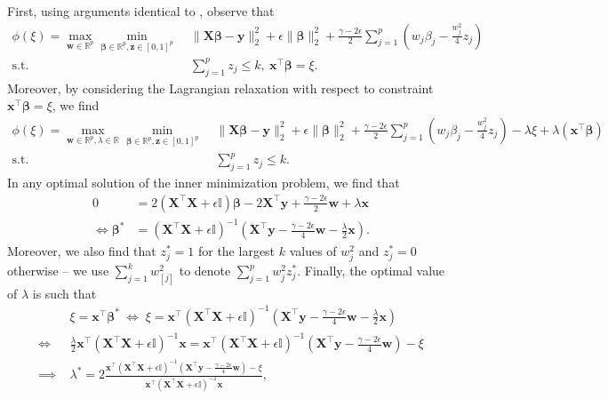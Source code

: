 \documentclass[opre,nonblindrev]{informs3} %
\begin{document}
First, using arguments identical to \cite{atamturk2020safe}, observe that
\begin{align*}
	\phi(\xi)=\max_{\bm{w}\in \mathbb{R}^p}\min_{\bm{\beta}\in \mathbb{R}^p,\bm{z}\in [0,1]^p}\;& \|\bm{X}\bm{\beta}-\bm{y}\|_2^2+\epsilon\|\bm{\beta}\|_2^2+\frac{\gamma-2\epsilon}{2}\sum_{j=1}^p \left(w_j\beta_j-\frac{w_j^2}{4}z_j\right)\\
	\text{s.t.}\;& \sum_{j=1}^p z_j\leq k,\ \bm{x^\top \beta}=\xi.
\end{align*}
Moreover, by considering the Lagrangian relaxation with respect to constraint $\bm{x^\top \beta}=\xi$, we find
\begin{align*}
	\phi(\xi)=\max_{\bm{w}\in \mathbb{R}^p,\lambda\in \mathbb{R}}\min_{\bm{\beta}\in \mathbb{R}^p,\bm{z}\in [0,1]^p}\;& \|\bm{X}\bm{\beta}-\bm{y}\|_2^2+\epsilon\|\bm{\beta}\|_2^2+\frac{\gamma-2\epsilon}{2}\sum_{j=1}^p \left(w_j\beta_j-\frac{w_j^2}{4}z_j\right)-\lambda\xi+\lambda (\bm{x^\top \beta})\\
	\text{s.t.}\;& \sum_{j=1}^p z_j\leq k.
\end{align*}
In any optimal solution of the inner minimization problem, we find that \begin{align*}0&=2(\bm{X}^\top \bm{X}+\epsilon\mathbb{I})\bm{\beta}-2\bm{X}^\top \bm{y}+\frac{\gamma-2\epsilon}{2}\bm{w}+\lambda \bm{x}\\
\Leftrightarrow\bm{\beta^*}&=\left(\bm{X}^\top \bm{X}+\epsilon\mathbb{I}\right)^{-1}\left(\bm{X}^\top \bm{y}-\frac{\gamma-2\epsilon}{4}\bm{w}-\frac{\lambda}{2} \bm{x}\right).
\end{align*}
Moreover, we also find that $z_j^*=1$ for the largest $k$ values of $w_j^2$ and $z_j^*=0$ otherwise -- we use $\sum_{j=1}^k w_{[j]}^2$ to denote $\sum_{j=1}^p w_j^2z_j^*$. Finally, the optimal value of $\lambda$ is such that 
\begin{align*}
&\xi=\bm{x^\top \beta^*}\ \Leftrightarrow\;\xi=\bm{x}^\top \left(\bm{X}^\top \bm{X}+\epsilon\mathbb{I}\right)^{-1}\left(\bm{X}^\top \bm{y}-\frac{\gamma-2\epsilon}{4}\bm{w}-\frac{\lambda}{2} \bm{x}\right)\\
\Leftrightarrow\;&\frac{\lambda}{2}\bm{x}^\top \left(\bm{X}^\top \bm{X}+\epsilon\mathbb{I}\right)^{-1}\bm{x}=\bm{x}^\top \left(\bm{X}^\top \bm{X}+\epsilon\mathbb{I}\right)^{-1}\left(\bm{X}^\top \bm{y}-\frac{\gamma-2\epsilon}{4}\bm{w}\right)-\xi\\
\implies\;&\lambda^*=2\frac{\bm{x}^\top \left(\bm{X}^\top \bm{X}+\epsilon\mathbb{I}\right)^{-1}\left(\bm{X}^\top \bm{y}-\frac{\gamma-2\epsilon}{4}\bm{w}\right)-\xi}{\bm{x}^\top \left(\bm{X}^\top \bm{X}+\epsilon\mathbb{I}\right)^{-1}\bm{x}},
\end{align*}
\end{document}
